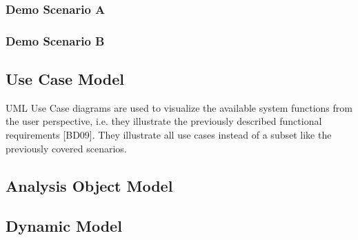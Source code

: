 \subsubsection{Demo Scenario A}

\subsubsection{Demo Scenario B}

\subsection{Use Case Model}
UML Use Case diagrams are used to visualize the available system functions from the user perspective, i.e. they illustrate the previously described functional requirements [BD09].
They illustrate all use cases instead of a subset like the previously covered scenarios.

\subsection{Analysis Object Model}
\subsection{Dynamic Model}
